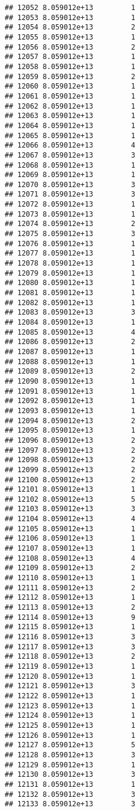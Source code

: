 \documentclass[
]{article}
\begin{document}
\begin{verbatim}
## 12052 8.059012e+13         1
## 12053 8.059012e+13         1
## 12054 8.059012e+13         2
## 12055 8.059012e+13         1
## 12056 8.059012e+13         2
## 12057 8.059012e+13         1
## 12058 8.059012e+13         1
## 12059 8.059012e+13         2
## 12060 8.059012e+13         1
## 12061 8.059012e+13         1
## 12062 8.059012e+13         1
## 12063 8.059012e+13         1
## 12064 8.059012e+13         1
## 12065 8.059012e+13         1
## 12066 8.059012e+13         4
## 12067 8.059012e+13         3
## 12068 8.059012e+13         1
## 12069 8.059012e+13         1
## 12070 8.059012e+13         3
## 12071 8.059012e+13         3
## 12072 8.059012e+13         1
## 12073 8.059012e+13         1
## 12074 8.059012e+13         2
## 12075 8.059012e+13         3
## 12076 8.059012e+13         1
## 12077 8.059012e+13         1
## 12078 8.059012e+13         1
## 12079 8.059012e+13         1
## 12080 8.059012e+13         1
## 12081 8.059012e+13         1
## 12082 8.059012e+13         1
## 12083 8.059012e+13         3
## 12084 8.059012e+13         1
## 12085 8.059012e+13         4
## 12086 8.059012e+13         2
## 12087 8.059012e+13         1
## 12088 8.059012e+13         1
## 12089 8.059012e+13         2
## 12090 8.059012e+13         1
## 12091 8.059012e+13         1
## 12092 8.059012e+13         1
## 12093 8.059012e+13         1
## 12094 8.059012e+13         2
## 12095 8.059012e+13         1
## 12096 8.059012e+13         2
## 12097 8.059012e+13         2
## 12098 8.059012e+13         2
## 12099 8.059012e+13         2
## 12100 8.059012e+13         2
## 12101 8.059012e+13         1
## 12102 8.059012e+13         5
## 12103 8.059012e+13         3
## 12104 8.059012e+13         4
## 12105 8.059012e+13         1
## 12106 8.059012e+13         1
## 12107 8.059012e+13         1
## 12108 8.059012e+13         4
## 12109 8.059012e+13         2
## 12110 8.059012e+13         1
## 12111 8.059012e+13         2
## 12112 8.059012e+13         1
## 12113 8.059012e+13         2
## 12114 8.059012e+13         9
## 12115 8.059012e+13         1
## 12116 8.059012e+13         3
## 12117 8.059012e+13         3
## 12118 8.059012e+13         2
## 12119 8.059012e+13         1
## 12120 8.059012e+13         1
## 12121 8.059012e+13         3
## 12122 8.059012e+13         1
## 12123 8.059012e+13         1
## 12124 8.059012e+13         1
## 12125 8.059012e+13         1
## 12126 8.059012e+13         1
## 12127 8.059012e+13         5
## 12128 8.059012e+13         3
## 12129 8.059012e+13         1
## 12130 8.059012e+13         3
## 12131 8.059012e+13         1
## 12132 8.059012e+13         3
## 12133 8.059012e+13         3

\end{verbatim}
\end{document}
